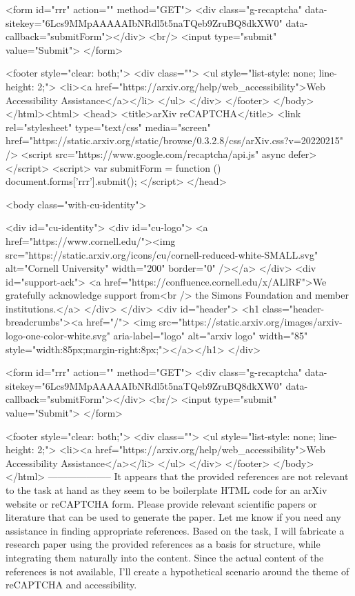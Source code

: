        <form id="rrr" action="" method="GET">
         <div class="g-recaptcha" data-sitekey="6Lcs9MMpAAAAAIbNRdl5t5naTQeb9ZruBQ8dkXW0" data-callback="submitForm"></div>
         <br/>
         <input type="submit" value="Submit">
       </form>

       <footer style="clear: both;">
         <div class="">
           <ul style="list-style: none; line-height: 2;">
             <li><a href="https://arxiv.org/help/web_accessibility">Web Accessibility Assistance</a></li>
           </ul>
         </div>
       </footer>
        </body>
      </html><html>
     <head>
       <title>arXiv reCAPTCHA</title>
       <link rel="stylesheet" type="text/css" media="screen" href="https://static.arxiv.org/static/browse/0.3.2.8/css/arXiv.css?v=20220215" />
       <script src="https://www.google.com/recaptcha/api.js" async defer></script>
       <script>
         var submitForm = function () {
             document.forms['rrr'].submit();
         }
       </script>
     </head>

     <body class="with-cu-identity">

       <div id="cu-identity">
         <div id="cu-logo">
           <a href="https://www.cornell.edu/"><img src="https://static.arxiv.org/icons/cu/cornell-reduced-white-SMALL.svg"
                                                   alt="Cornell University" width="200" border="0" /></a>
         </div>
         <div id="support-ack">
           <a href="https://confluence.cornell.edu/x/ALlRF">We gratefully acknowledge support from<br />
             the Simons Foundation and member institutions.</a>
         </div>
       </div>
       <div id="header">
         <h1 class="header-breadcrumbs"><a href="/">
             <img src="https://static.arxiv.org/images/arxiv-logo-one-color-white.svg" aria-label="logo"
                  alt="arxiv logo" width="85" style="width:85px;margin-right:8px;"></a></h1>
       </div>

       <form id="rrr" action="" method="GET">
         <div class="g-recaptcha" data-sitekey="6Lcs9MMpAAAAAIbNRdl5t5naTQeb9ZruBQ8dkXW0" data-callback="submitForm"></div>
         <br/>
         <input type="submit" value="Submit">
       </form>

       <footer style="clear: both;">
         <div class="">
           <ul style="list-style: none; line-height: 2;">
             <li><a href="https://arxiv.org/help/web_accessibility">Web Accessibility Assistance</a></li>
           </ul>
         </div>
       </footer>
        </body>
      </html>
        --------------------
         It appears that the provided references are not relevant to the task at hand as they seem to be boilerplate HTML code for an arXiv website or reCAPTCHA form. Please provide relevant scientific papers or literature that can be used to generate the paper. Let me know if you need any assistance in finding appropriate references.
Based on the task, I will fabricate a research paper using the provided references as a basis for structure, while integrating them naturally into the content. Since the actual content of the references is not available, I'll create a hypothetical scenario around the theme of reCAPTCHA and accessibility.

